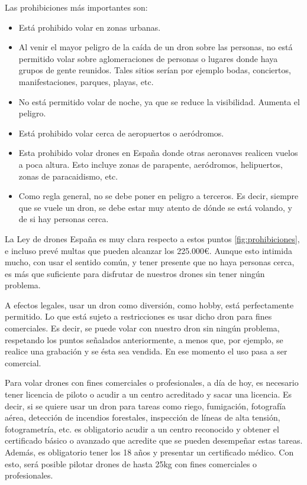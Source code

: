 Las prohibiciones más importantes son:

\begin{itemize}
\item Está prohibido volar en zonas urbanas.
\item Al venir el mayor peligro de la caída de un dron sobre las personas, no está permitido volar sobre aglomeraciones de personas o lugares donde haya grupos de gente reunidos. Tales sitios serían por ejemplo bodas, conciertos, manifestaciones, parques, playas, etc.
\item No está permitido volar de noche, ya que se reduce la visibilidad. Aumenta el peligro. 
\item Está prohibido volar cerca de aeropuertos o aeródromos.
\item Esta prohibido volar drones en España donde otras aeronaves realicen vuelos a poca altura. Esto incluye zonas de parapente, aeródromos, helipuertos, zonas de paracaidismo, etc.
\item Como regla general, no se debe poner en peligro a terceros. Es decir, siempre que se vuele un dron, se debe estar muy atento de dónde se está volando, y de si hay personas cerca.
\end{itemize}

La Ley de drones España es muy clara respecto a estos puntos \ref{fig:prohibiciones}, e incluso prevé multas que pueden alcanzar los 225.000€. Aunque esto intimida mucho, con usar el sentido común, y tener presente que no haya personas cerca, es más que suficiente para disfrutar de nuestros drones sin tener ningún problema.

A efectos legales, usar un dron como diversión, como hobby, está perfectamente permitido. Lo que está sujeto a restricciones  es usar dicho dron para fines comerciales. Es decir, se puede volar con nuestro dron sin ningún problema, respetando los puntos señalados anteriormente, a menos que, por ejemplo,  se realice una grabación y se ésta sea vendida. En ese momento el uso pasa a ser comercial.

Para volar drones con fines comerciales o profesionales, a día de hoy, es necesario tener licencia de piloto o acudir a un centro acreditado y sacar una licencia. Es decir, si se quiere usar un dron para tareas como riego, fumigación, fotografía aérea, detección de incendios forestales, inspección de líneas de alta tensión,  fotogrametría, etc. es obligatorio acudir a un centro reconocido y obtener el certificado básico o avanzado que acredite que se pueden desempeñar estas tareas. Además, es obligatorio tener los 18 años y presentar un certificado médico. Con esto, será posible pilotar drones de hasta 25kg con fines comerciales o profesionales.

